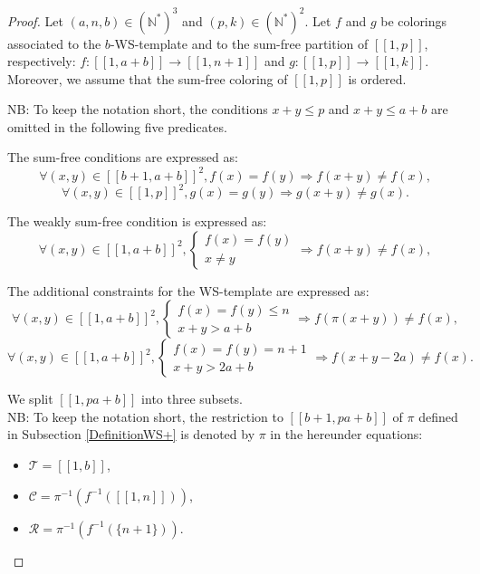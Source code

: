 \documentclass{article}
\newtheorem{computational theorem}[definition]{Computational Theorem}
\begin{document}
\begin{proof}
\begin{sloppypar}
Let \((a,n,b) \in (\mathbb{N}^*)^3\) and \((p,k) \in (\mathbb{N}^*)^2\). Let \(f\) and \(g\) be colorings associated 
to the \(b\)-WS-template and to the sum-free partition of \([\![1,p]\!]\), respectively: 
\({f : [\![1, a + b]\!] \longrightarrow [\![1,n+1]\!]}\) and \({g : [\![1, p]\!]  \longrightarrow [\![1, k]\!]}\). Moreover, 
we assume that the sum-free coloring of \([\![1, p]\!]\) is ordered.
\end{sloppypar}

\par
NB: To keep the notation short, the conditions \(x + y \leqslant p\)  and \(x + y \leqslant a + b\) are omitted in the following five predicates.

The sum-free conditions are expressed as:
\[
\forall (x,y) \in [\![b+1,a + b]\!]^2, f(x) = f(y) \Longrightarrow f(x+y) \neq f(x),
\]
\[
\forall (x,y) \in [\![1,p]\!]^2, g(x) = g(y) \Longrightarrow g(x+y) \neq g(x).
\]

The weakly sum-free condition is expressed as:
\[
\forall (x,y) \in [\![1,a + b]\!]^2, \left\{
\begin{array}{l}
	f(x) = f(y) \\
	x \neq y
\end{array}
\right. \Longrightarrow f(x+y) \neq f(x),
\]

The  additional constraints for the WS-template are expressed as:
\[
\forall (x,y) \in [\![1,a + b]\!]^2, \left\{
\begin{array}{l}
	f(x) = f(y) \leqslant n \\
	x + y > a + b
\end{array}
\right. \Longrightarrow f(\pi(x+y)) \neq f(x),
\]
\[
\forall (x,y) \in [\![1,a + b]\!]^2, \left\{
\begin{array}{l}
	f(x) = f(y) = n + 1 \\
	x + y > 2 a + b
\end{array}
\right. \Longrightarrow f(x+y - 2 a) \neq f(x).
\]

We split \([\![1, p a + b]\!]\) into three subsets. \\
NB: To keep the notation short, the restriction to \([\![b + 1, p a + b]\!]\) of \(\pi\) defined in Subsection \ref{DefinitionWS+}
is denoted by \(\pi\) in the hereunder equations:

\begin{itemize}
	\item \(\mathcal{T} = [\![1, b]\!]\),
	\item \(\mathcal{C} = \pi^{-1}(f^{-1}([\![1, n]\!]))\),
	\item \(\mathcal{R} = \pi^{-1}(f^{-1}(\{n + 1\}))\).
\end{itemize}


\end{proof}
\end{document}
